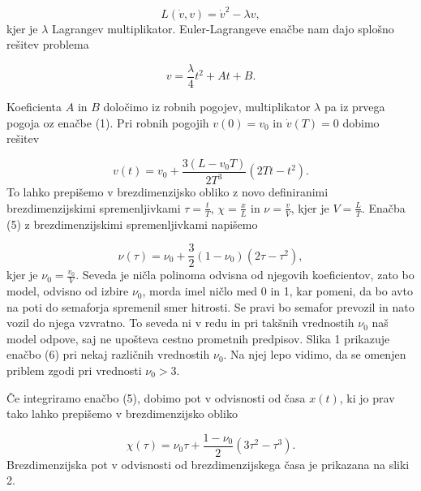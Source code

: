 \documentclass[slovene,11pt,a4paper]{article}
\begin{document}
\begin{equation}
L(\dot{v}, v) = \dot{v}^2 - \lambda v,
\end{equation}
kjer je $\lambda$ Lagrangev multiplikator. Euler-Lagrangeve enačbe nam dajo splošno rešitev problema

\begin{equation}
v = \frac{\lambda}{4} t^2 + At + B.
\end{equation}

Koeficienta $A$ in $B$ določimo iz robnih pogojev, multiplikator $\lambda$ pa iz prvega pogoja oz enačbe (1). Pri robnih pogojih $v(0) = v_0$ in $\dot{v}(T) = 0$ dobimo rešitev

\begin{equation}
v(t) = v_0 + \frac{3(L-v_0 T)}{2T^3} (2Tt-t^2).
\end{equation}
To lahko prepišemo v brezdimenzijsko obliko z novo definiranimi  brezdimenzijskimi spremenljivkami $\tau = \frac{t}{T}$, $\chi = \frac{x}{L}$ in $\nu = \frac{v}{V}$, kjer je $V = \frac{L}{T}$. Enačba (5) z brezdimenzijskimi spremenljivkami napišemo

\begin{equation}
\nu(\tau) = \nu_0 + \frac{3}{2}(1-\nu_0)(2\tau-\tau^2),
\end{equation}
kjer je $\nu_0 = \frac{v_0}{V}$. Seveda je ničla polinoma odvisna od njegovih koeficientov, zato bo model, odvisno od izbire $\nu_0$, morda imel ničlo med 0 in 1, kar pomeni, da bo avto na poti do semaforja spremenil smer hitrosti. Se pravi bo semafor prevozil in nato vozil do njega vzvratno. To seveda ni v redu in pri takšnih vrednostih $\nu_0$ naš model odpove, saj ne upošteva cestno prometnih predpisov. Slika 1 prikazuje enačbo (6) pri nekaj različnih vrednostih $\nu_0$. Na njej lepo vidimo, da se omenjen priblem zgodi pri vrednosti $\nu_0 > 3$.

Če integriramo enačbo (5), dobimo pot v odvisnosti od časa $x(t)$, ki jo prav tako lahko prepišemo v brezdimenzijsko obliko

\begin{equation}
\chi(\tau) = \nu_0 \tau + \frac{1-\nu_0}{2}(3\tau^2 - \tau^3).
\end{equation}
Brezdimenzijska pot v odvisnosti od brezdimenzijskega časa je prikazana na sliki 2.
\newpage
\end{document}

